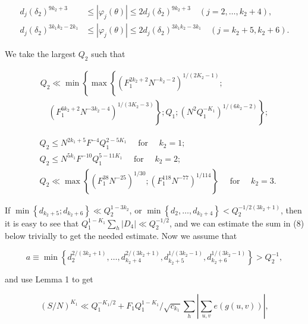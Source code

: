 \documentclass[10pt]{article}
\begin{document}
$$
\begin{aligned}
d_{j}\left(\delta_{2}\right)^{9 k_{2}+3} & \leqslant\left|\varphi_{j}(\theta)\right| \leqslant 2 d_{j}\left(\delta_{2}\right)^{9 k_{2}+3} \quad\left(j=2, \ldots, k_{2}+4\right), \\
d_{j}\left(\delta_{2}\right)^{3 k_{1} k_{2}-2 k_{1}} & \leqslant\left|\varphi_{j}(\theta)\right| \leqslant 2 d_{j}\left(\delta_{2}\right)^{3 k_{1} k_{2}-3 k_{1}} \quad\left(j=k_{2}+5, k_{2}+6\right) .
\end{aligned}
$$

We take the largest $Q_{2}$ such that

$$
\begin{aligned}
Q_{2} \ll \min \left\{\operatorname { m a x } \left\{\left(F_{1}^{2 k_{2}+2} N^{-k_{2}-2}\right)^{1 /\left(2 K_{2}-1\right)} ;\right.\right. \\
\left.\left.\quad\left(F_{1}^{6 k_{2}+2} N^{-3 k_{2}-4}\right)^{1 /\left(3 K_{2}-3\right)}\right\} ; Q_{1} ;\left(N^{2} Q_{1}^{-K_{1}}\right)^{1 /\left(6 k_{2}-2\right)}\right\} ;
\end{aligned}
$$

$$
\begin{aligned}
& Q_{2} \leqslant N^{2 k_{1}+5} F^{-4} Q_{1}^{2-5 K_{1}} \quad \text { for } \quad k_{2}=1 ; \\
& Q_{2} \leqslant N^{5 k_{1}} F^{-10} Q_{1}^{5-11 K_{1}} \quad \text { for } \quad k_{2}=2 ; \\
& Q_{2} \ll \max \left\{\left(F_{1}^{38} N^{-25}\right)^{1 / 30} ;\left(F_{1}^{118} N^{-77}\right)^{1 / 114}\right\} \quad \text { for } \quad k_{2}=3 .
\end{aligned}
$$

If $\min \left\{d_{k_{2}+5} ; d_{k_{2}+6}\right\} \ll Q_{2}^{1-3 k_{2}}$, or $\min \left\{d_{2}, \ldots, d_{k_{2}+4}\right\}<Q_{2}^{-1 / 2\left(3 k_{2}+1\right)}$, then it is easy to see that $Q_{1}^{1-K_{1}} \sum_{h}\left|D_{4}\right| \ll Q_{2}^{-1 / 2}$, and we can estimate the sum in (8) below trivially to get the needed estimate. Now we assume that

$$
a \equiv \min \left\{d_{2}^{2 /\left(3 k_{2}+1\right)}, \ldots, d_{k_{2}+4}^{2 /\left(3 k_{2}+1\right)}, d_{k_{2}+5}^{1 /\left(3 k_{2}-1\right)}, d_{k_{2}+6}^{1 /\left(3 k_{2}-1\right)}\right\}>Q_{2}^{-1},
$$

and use Lemma 1 to get


\begin{equation*}
(S / N)^{K_{1}} \ll Q_{1}^{-K_{1} / 2}+F_{1} Q_{1}^{1-K_{1}} / \sqrt{c_{k_{1}}} \sum_{h}\left|\sum_{u, v} e(g(u, v))\right|, \tag{8}
\end{equation*}
\end{document}
